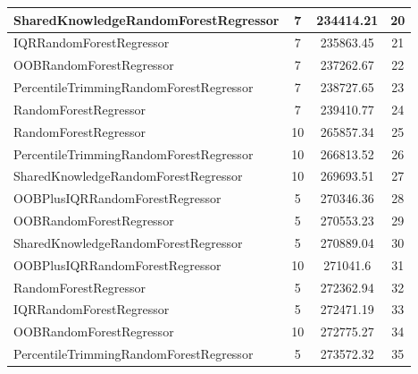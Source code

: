 \begin{table}[h]
\begin{tabular}{|l|c|c|c|}
\textcolor[HTML]{ef9b20}{SharedKnowledgeRandomForestRegressor} & 7 & 234414.21 & 20 \\ \hline
\textcolor[HTML]{27aeef}{IQRRandomForestRegressor} & 7 & 235863.45 & 21 \\ \hline
\textcolor[HTML]{b33dc6}{OOBRandomForestRegressor} & 7 & 237262.67 & 22 \\ \hline
\textcolor[HTML]{f46a9b}{PercentileTrimmingRandomForestRegressor} & 7 & 238727.65 & 23 \\ \hline
\textcolor[HTML]{87bc45}{RandomForestRegressor} & 7 & 239410.77 & 24 \\ \hline
\textcolor[HTML]{87bc45}{RandomForestRegressor} & 10 & 265857.34 & 25 \\ \hline
\textcolor[HTML]{f46a9b}{PercentileTrimmingRandomForestRegressor} & 10 & 266813.52 & 26 \\ \hline
\textcolor[HTML]{ef9b20}{SharedKnowledgeRandomForestRegressor} & 10 & 269693.51 & 27 \\ \hline
\textcolor[HTML]{ede15b}{OOBPlusIQRRandomForestRegressor} & 5 & 270346.36 & 28 \\ \hline
\textcolor[HTML]{b33dc6}{OOBRandomForestRegressor} & 5 & 270553.23 & 29 \\ \hline
\textcolor[HTML]{ef9b20}{SharedKnowledgeRandomForestRegressor} & 5 & 270889.04 & 30 \\ \hline
\textcolor[HTML]{ede15b}{OOBPlusIQRRandomForestRegressor} & 10 & 271041.6 & 31 \\ \hline
\textcolor[HTML]{87bc45}{RandomForestRegressor} & 5 & 272362.94 & 32 \\ \hline
\textcolor[HTML]{27aeef}{IQRRandomForestRegressor} & 5 & 272471.19 & 33 \\ \hline
\textcolor[HTML]{b33dc6}{OOBRandomForestRegressor} & 10 & 272775.27 & 34 \\ \hline
\textcolor[HTML]{f46a9b}{PercentileTrimmingRandomForestRegressor} & 5 & 273572.32 & 35 \\ \hline
\end{tabular}
\end{table}

